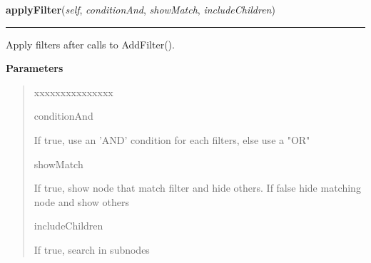     \label{tracetool:WinTrace:applyFilter}

    \vspace{0.5ex}

\hspace{.8\funcindent}\begin{boxedminipage}{\funcwidth}

    \raggedright \textbf{applyFilter}(\textit{self}, \textit{conditionAnd}, \textit{showMatch}, \textit{includeChildren})

    \vspace{-1.5ex}

    \rule{\textwidth}{0.5\fboxrule}
\setlength{\parskip}{2ex}
    Apply filters after calls to AddFilter().

\setlength{\parskip}{1ex}
      \textbf{Parameters}
      \vspace{-1ex}

      \begin{quote}
        \begin{Ventry}{xxxxxxxxxxxxxxx}

          \item[conditionAnd]

          If true, use an 'AND' condition for each filters, else use a "OR"

          \item[showMatch]

          If true, show node that match filter and hide others. If false 
          hide matching node and show others

          \item[includeChildren]

          If true, search in subnodes

        \end{Ventry}

      \end{quote}

    \end{boxedminipage}

    \label{tracetool:WinTrace:saveToTextfile}

    \vspace{0.5ex}

